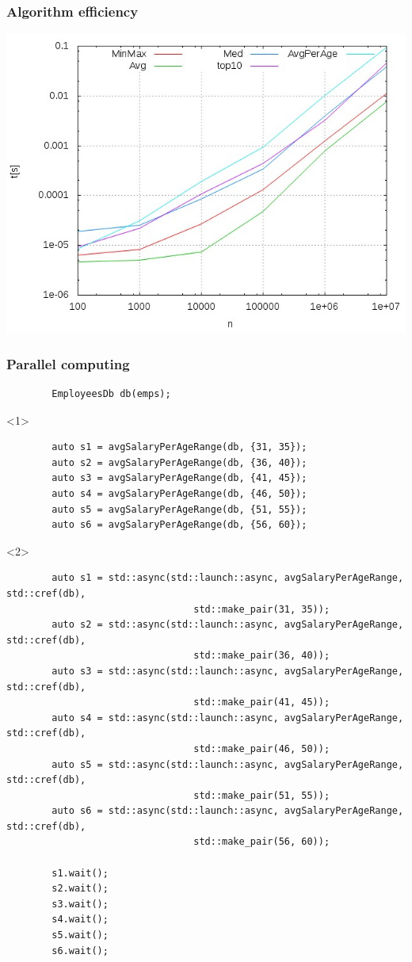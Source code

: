 \documentclass{beamer}
\begin{document}
\begin{frame}
\frametitle{Algorithm efficiency}
	\includegraphics[width=\textwidth,height=0.8\textheight,keepaspectratio]
					{perf.jpeg}
\end{frame}

\begin{frame}[fragile,t]
\frametitle{Parallel computing}

	\begin{lstlisting}
		EmployeesDb db(emps);	
	\end{lstlisting}
	\begin{onlyenv}
	\begin{lstlisting}
		auto s1 = avgSalaryPerAgeRange(db, {31, 35});
		auto s2 = avgSalaryPerAgeRange(db, {36, 40});
		auto s3 = avgSalaryPerAgeRange(db, {41, 45});
		auto s4 = avgSalaryPerAgeRange(db, {46, 50});
		auto s5 = avgSalaryPerAgeRange(db, {51, 55});
		auto s6 = avgSalaryPerAgeRange(db, {56, 60});
	\end{lstlisting}
	\end{onlyenv}
	
	\begin{onlyenv}
	\begin{lstlisting}
		auto s1 = std::async(std::launch::async, avgSalaryPerAgeRange, std::cref(db),
                                 std::make_pair(31, 35));
		auto s2 = std::async(std::launch::async, avgSalaryPerAgeRange, std::cref(db),
                                 std::make_pair(36, 40));
        auto s3 = std::async(std::launch::async, avgSalaryPerAgeRange, std::cref(db),
                                 std::make_pair(41, 45));
        auto s4 = std::async(std::launch::async, avgSalaryPerAgeRange, std::cref(db),
                                 std::make_pair(46, 50));
        auto s5 = std::async(std::launch::async, avgSalaryPerAgeRange, std::cref(db),
                                 std::make_pair(51, 55));
        auto s6 = std::async(std::launch::async, avgSalaryPerAgeRange, std::cref(db),
                                 std::make_pair(56, 60));

        s1.wait();
        s2.wait();
        s3.wait();
        s4.wait();
        s5.wait();
        s6.wait();
	\end{lstlisting}
	\end{onlyenv}
\end{frame}
\end{document}
